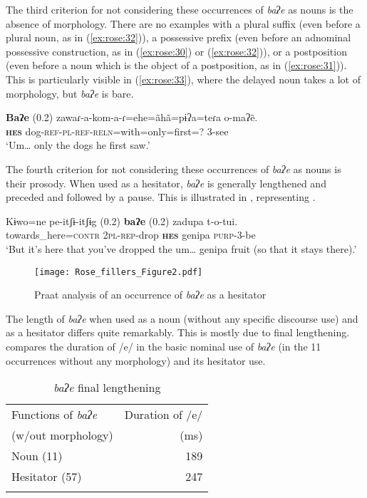 \documentclass[output=paper]{langscibook}
\begin{document}
The third criterion for not considering these occurrences of \textit{baʔe} as nouns is the absence of morphology. There are no examples with a plural suffix (even before a plural noun, as in (\ref{ex:rose:32})), a possessive prefix (even before an adnominal possessive construction, as in (\ref{ex:rose:30}) or (\ref{ex:rose:32})), or a postposition (even before a noun which is the object of a postposition, as in (\ref{ex:rose:31})). This is particularly visible in (\ref{ex:rose:33}), where the delayed noun takes a lot of morphology, but \textit{baʔe} is bare.


\ea \label{ex:rose:33}
\gll \textbf{Baʔe} (0.2)  zawaɾ-a-kom-a-ɾ=ehe=ãhã=pɨʔa=teɾa  o-maʔẽ.\\
\textbf{\textsc{hes}} {} dog-\textsc{ref}{}-\textsc{pl}{}-\textsc{ref}{}-\textsc{reln}=with=only=first=?  3-see\\
\glt ‘Um… only the dogs he first saw.’ 
\z 

The fourth criterion for not considering these occurrences of \textit{baʔe} as nouns is their prosody. When used as a hesitator, \textit{baʔe} is generally lengthened and preceded and followed by a pause. This is illustrated in , representing .


\ea \label{ex:rose:34}
\gll Kɨwo=ne  pe-itʃɨ-itʃɨg (0.2)  \textbf{baʔe} (0.2)  zadupa  t-o-tui.\\
towards\_here=\textsc{contr}  2\textsc{pl}{}-\textsc{rep}{}-drop {} \textbf{\textsc{hes}} {} genipa  \textsc{purp-3-}be \\
\glt ‘But it’s here that you’ve dropped the um… genipa fruit (so that it stays there).’ 
\z


\begin{figure}
\texttt{[image: Rose\_fillers\_Figure2.pdf]}
\caption{\label{fig:rose:2}Praat analysis of an occurrence of \textit{baʔe} as a hesitator}
\end{figure}

The length of \textit{baʔe} when used as a noun (without any specific discourse use) and as a hesitator differs quite remarkably. This is mostly due to final lengthening.  compares the duration of /e/ in the basic nominal use of \textit{baʔe} (in the 11 occurrences without any morphology) and its hesitator use.

\begin{table}
\begin{tabular}{lr}
\lsptoprule
Functions of \textit{baʔe} & Duration of /e/\\ 
(w/out morphology) & (ms) \\
\midrule
Noun (11) & 189 \\
Hesitator (57) & 247\\
\lspbottomrule
\end{tabular}
\caption{\label{tab:rose:4}\textit{baʔe} final lengthening}
\end{table}
\end{document}
